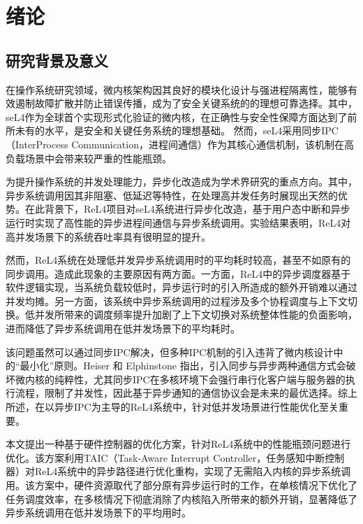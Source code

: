 \chapter{绪论}

\section{研究背景及意义}

在操作系统研究领域，微内核架构因其良好的模块化设计与强进程隔离性，能够有效遏制故障扩散并防止错误传播，成为了安全关键系统的的理想可靠选择\cite{nandy2024resource}。其中，seL4作为全球首个实现形式化验证\cite{Klein2009seL4}的微内核，在正确性与安全性保障方面达到了前所未有的水平，是安全和关键任务系统的理想基础\cite{heiser2025fastsecureadaptablelionsos}。
然而，seL4采用同步IPC（InterProcess Communication，进程间通信）作为其核心通信机制，该机制在高负载场景中会带来较严重的性能瓶颈\cite{mergendahl2022thundering}。

为提升操作系统的并发处理能力，异步化改造成为学术界研究的重点方向。其中，异步系统调用因其非阻塞、低延迟等特性，在处理高并发任务时展现出天然的优势\cite{Nakajima2021Asyncsyscall}。在此背景下，ReL4项目\cite{rel4_kernel}对seL4系统进行异步化改造，基于用户态中断和异步运行时实现了高性能的异步进程间通信与异步系统调用。实验结果表明，ReL4对高并发场景下的系统吞吐率具有很明显的提升。

然而，ReL4系统在处理低并发异步系统调用时的平均耗时较高，甚至不如原有的同步调用。造成此现象的主要原因有两方面。一方面，ReL4中的异步调度器基于软件逻辑实现，当系统负载较低时，异步运行时的引入所造成的额外开销难以通过并发均摊。另一方面，该系统中异步系统调用的过程涉及多个协程调度与上下文切换。低并发所带来的调度频率提升加剧了上下文切换对系统整体性能的负面影响，进而降低了异步系统调用在低并发场景下的平均耗时。

该问题虽然可以通过同步IPC解决，但多种IPC机制的引入违背了微内核设计中的“最小化”原则\cite{liedtke}。Heiser 和 Elphinstone 指出，引入同步与异步两种通信方式会破坏微内核的纯粹性，尤其同步IPC在多核环境下会强行串行化客户端与服务器的执行流程，限制了并发性，因此基于异步通知的通信协议会是未来的最优选择\cite{heiser2013from}。综上所述，在以异步IPC为主导的ReL4系统中，针对低并发场景进行性能优化至关重要。

本文提出一种基于硬件控制器的优化方案，针对ReL4系统中的性能瓶颈问题进行优化。该方案利用TAIC（Task-Aware Interrupt Controller，任务感知中断控制器）对ReL4系统中的异步路径进行优化重构，实现了无需陷入内核的异步系统调用。该方案中，硬件资源取代了部分原有异步运行时的工作，在单核情况下优化了任务调度效率，在多核情况下彻底消除了内核陷入所带来的额外开销，显著降低了异步系统调用在低并发场景下的平均用时。

